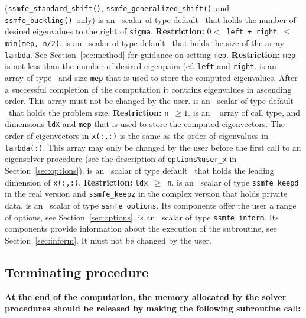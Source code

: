 \begin{description}
%
({\tt ssmfe\_standard\_shift()}, {\tt ssmfe\_generalized\_shift()}\
and {\tt ssmfe\_buckling()}\ only)
is an \intentin\ scalar of type default \Integer\ 
that holds the number of desired eigenvalues to the right of {\tt sigma}.
{\bf Restriction:} {\tt $0 < $ left + right $\le$ min(mep, n/2)}.
%
\itt{mep} is an \intentin\ scalar of type default \Integer\ 
that holds the size of the array {\tt lambda}.
See Section~\ref{sec:method} for guidance on
setting {\tt mep}.
{\bf Restriction:} 
{\tt mep} is not less than the number of desired eigenpairs
(cf. {\tt left} and {\tt right}.
%
\itt{lambda(:)} is an \intentinout\ %
array of type \REALDP\
and size {\tt mep} that is
used to store the computed eigenvalues.
After a successful completion of the computation
it contains eigenvalues in ascending order.
This array must not be changed by the user.
%
\itt{n} is an \intentin\ scalar of type default \Integer\ 
that holds the problem size.
{\bf Restriction:} {\tt n $\ge 1$}.
%
 is an \intentinout\ %
array of call type,
and dimensions {\tt ldX} and {\tt mep} that is
used to store the computed eigenvectors.
The order of eigenvectors in {\tt x(:,:)}
is the same as the order of eigenvalues in {\tt lambda(:)}.
This array may only be changed by the user
before the first call to an eigensolver procedure
(see the description of {\tt options\%user\_x} in Section~\ref{sec:options}).
%
\itt{ldx} is an \intentin\ scalar of type default \Integer\ 
that holds the leading dimension of {\tt x(:,:)}.
{\bf Restriction:} {\tt ldx $\ge$ n}.
%
\itt{keep} is an \intentinout\ scalar of type 
{\tt ssmfe\_keepd} in the real version and
{\tt ssmfe\_keepz} in the complex version
that holds private data. 
%
 is an \intentin\  scalar  of type {\tt ssmfe\_options}.
Its components offer the user a range of options,
see Section~\ref{sec:options}.
%
\itt{inform} is an \intentinout\ scalar of type 
{\tt ssmfe\_inform}. Its components provide information about the execution
of the subroutine, see Section~\ref{sec:inform}.
It must not be changed by the user.
%
\end{description}

\subsection{Terminating procedure}

{\bf
At the end of the computation, the memory 
allocated by the solver procedures
should be released
by making the following subroutine call:
}


